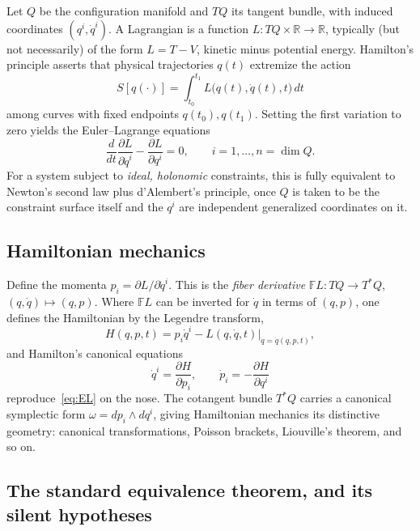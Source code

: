 \documentclass[11pt]{article}
\newcommand{\FL}{\mathbb{F}L}
\newcommand{\dd}[2]{\frac{\partial #1}{\partial #2}}
\newcommand{\R}{\mathbb{R}}
\begin{document}
Let $Q$ be the configuration manifold and $TQ$ its tangent bundle, with induced coordinates $(q^i,\dot q^i)$. A Lagrangian is a function $L : TQ \times \R \to \R$, typically (but not necessarily) of the form $L = T - V$, kinetic minus potential energy. Hamilton's principle asserts that physical trajectories $q(t)$ extremize the action
\begin{equation}
S[q(\cdot)] = \int_{t_0}^{t_1} L\big(q(t),\dot q(t), t\big)\, dt
\end{equation}
among curves with fixed endpoints $q(t_0), q(t_1)$. Setting the first variation to zero yields the Euler--Lagrange equations
\begin{equation}
\label{eq:EL}
\frac{d}{dt}\dd{L}{\dot q^i} - \dd{L}{q^i} = 0 , \qquad i = 1,\dots,n=\dim Q .
\end{equation}
For a system subject to \emph{ideal, holonomic} constraints, this is fully equivalent to Newton's second law plus d'Alembert's principle, once $Q$ is taken to be the constraint surface itself and the $q^i$ are independent generalized coordinates on it.

\subsection{Hamiltonian mechanics}

Define the momenta $p_i = \partial L/\partial \dot q^i$. This is the \emph{fiber derivative} $\FL: TQ \to T^*Q$, $(q,\dot q)\mapsto (q,p)$. Where $\FL$ can be inverted for $\dot q$ in terms of $(q,p)$, one defines the Hamiltonian by the Legendre transform,
\begin{equation}
H(q,p,t) = p_i \dot q^i - L(q,\dot q, t)\Big|_{\dot q = \dot q(q,p,t)} ,
\end{equation}
and Hamilton's canonical equations
\begin{equation}
\label{eq:Ham}
\dot q^i = \dd{H}{p_i}, \qquad \dot p_i = -\dd{H}{q^i}
\end{equation}
reproduce~\eqref{eq:EL} on the nose. The cotangent bundle $T^*Q$ carries a canonical symplectic form $\omega = dp_i \wedge dq^i$, giving Hamiltonian mechanics its distinctive geometry: canonical transformations, Poisson brackets, Liouville's theorem, and so on.

\subsection{The standard equivalence theorem, and its silent hypotheses}
\label{sec:hypotheses}
\end{document}
